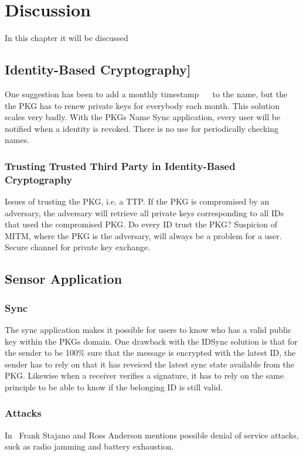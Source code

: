 \chapter{Discussion}
In this chapter it will be discussed 

\section{Identity-Based Cryptography]}
One suggestion has been to add a monthly timestamp~\cite{DBLP:journals/iacr/BoldyrevaGK12} ~\cite{DBLP:conf/ctrsa/LibertV09}  to the name, but the the \gls{PKG} has to renew private keys for everybody each month. 
This solution scales very badly.
With the \gls{PKG}s Name Sync application, every user will be notified when a identity is revoked.
There is no use for periodically checking names.

\subsection{Trusting Trusted Third Party in Identity-Based Cryptography}
Issues of trusting the \gls{PKG}, i.e. a \gls{TTP}. 
If the \gls{PKG} is compromised by an adversary, the adversary will retrieve all private keys corresponding to all IDs that used the compromised \gls{PKG}. 
Do every ID trust the \gls{PKG}? Suspicion of \gls{MITM}, where the \gls{PKG} is the adversary, will always be a problem for a user.
Secure channel for private key exchange. 

\section{Sensor Application}

\subsection{Sync}
The sync application makes it possible for users to know who has a valid public key within the \gls{PKG}s domain.
One drawback with the IDSync solution is that for the sender to be 100\% sure that the message is encrypted with the latest \gls{ID}, the sender has to rely on that it has reveiced the latest sync state available from the \gls{PKG}.
Likewise when a receiver verifies a signature, it has to rely on the same principle to be able to know if the belonging \gls{ID} is still valid.

\subsection{Attacks}
In~\cite{DBLP:conf/spw/StajanoA99} Frank Stajano and Ross Anderson mentions possible denial of service attacks, suck as radio jamming and battery exhaustion. 